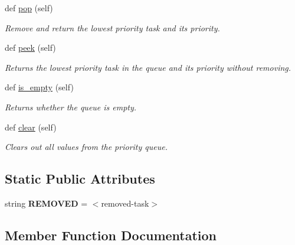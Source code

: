 \begin{DoxyCompactItemize}
def \hyperlink{class_build_1_1_simulation___operation_1_1queue_1_1_priority_queue_aff0c9a1aefbac68dd00cb274adb1d739}{pop} (self)
\begin{DoxyCompactList}\small\item\em Remove and return the lowest priority task and its priority. \end{DoxyCompactList}\item 
def \hyperlink{class_build_1_1_simulation___operation_1_1queue_1_1_priority_queue_aae2cb79110fbe3917ede657052bb3976}{peek} (self)
\begin{DoxyCompactList}\small\item\em Returns the lowest priority task in the queue and its priority without removing. \end{DoxyCompactList}\item 
def \hyperlink{class_build_1_1_simulation___operation_1_1queue_1_1_priority_queue_a62ca97541bd2863177111afa2ebf01f0}{is\+\_\+empty} (self)
\begin{DoxyCompactList}\small\item\em Returns whether the queue is empty. \end{DoxyCompactList}\item 
def \hyperlink{class_build_1_1_simulation___operation_1_1queue_1_1_priority_queue_aeac0d1993374ae61b482b14cfe824473}{clear} (self)
\begin{DoxyCompactList}\small\item\em Clears out all values from the priority queue. \end{DoxyCompactList}\end{DoxyCompactItemize}
\subsection*{Static Public Attributes}
\begin{DoxyCompactItemize}
\item 
\mbox{\label{class_build_1_1_simulation___operation_1_1queue_1_1_priority_queue_add1fdf8c2db1431d3368ca1f9a1b56e6}} 
string {\bfseries R\+E\+M\+O\+V\+ED} = \textquotesingle{}$<$removed-\/task$>$\textquotesingle{}
\end{DoxyCompactItemize}


\subsection{Member Function Documentation}
\mbox{\label{class_build_1_1_simulation___operation_1_1queue_1_1_priority_queue_a042956dd1eaf2317965630e8deed80b3}} 
